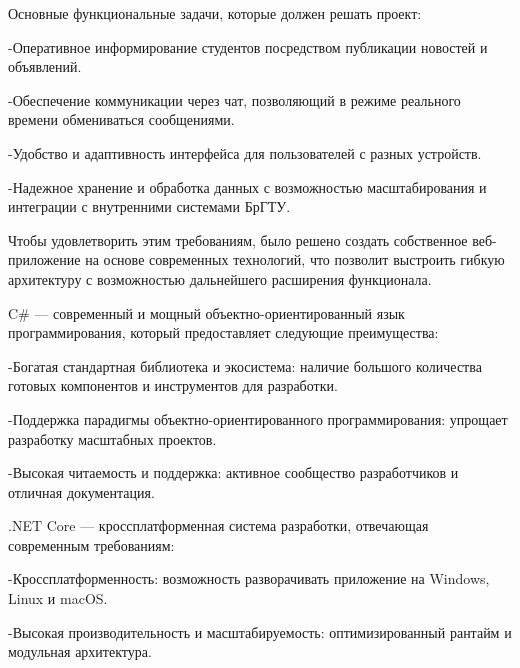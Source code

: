{\gostFont
	
	\par \redline Основные функциональные задачи, которые должен решать проект:
	
	\par \redline -Оперативное информирование студентов посредством публикации новостей и объявлений.
	
	\par \redline -Обеспечение коммуникации через чат, позволяющий в режиме реального времени обмениваться сообщениями.
	
	\par \redline -Удобство и адаптивность интерфейса для пользователей с разных устройств.
	
	\par \redline -Надежное хранение и обработка данных с возможностью масштабирования и интеграции с внутренними системами БрГТУ.
	
	\par \redline Чтобы удовлетворить этим требованиям, было решено создать собственное веб-приложение на основе современных технологий, что позволит выстроить гибкую архитектуру с возможностью дальнейшего расширения функционала. 
	
	\par \redline C\# — современный и мощный объектно-ориентированный язык программирования, который предоставляет следующие преимущества:
	
	\par \redline -Богатая стандартная библиотека и экосистема: наличие большого количества готовых компонентов и инструментов для разработки.
	
	\par \redline -Поддержка парадигмы объектно-ориентированного программирования: упрощает разработку масштабных проектов.
	
	\par \redline -Высокая читаемость и поддержка: активное сообщество разработчиков и отличная документация.
	
	\par \redline .NET Core — кроссплатформенная система разработки, отвечающая современным требованиям:
	
	\par \redline -Кроссплатформенность: возможность разворачивать приложение на Windows, \\Linux и macOS.
	
	\par \redline -Высокая производительность и масштабируемость: оптимизированный рантайм и модульная архитектура.
	
}
